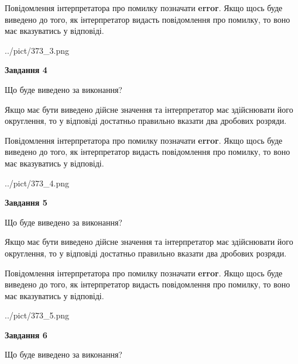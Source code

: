 \documentclass[12pt, ukrainian]{article}
\begin{document}
{\begin {Large}
Повідомлення інтерпретатора про помилку позначати \textbf{error}.
Якщо щось буде виведено до того, як інтерпретатор видасть повідомлення про помилку, 
то воно має вказуватись у відповіді. \par

\begin{center}
	{../pict/373_3.png}
\end{center}
\newpage

{\begin {center}\textbf{Завдання 4}\end {center}}\par
Що буде виведено за виконання? \par

Якщо має бути виведено дійсне значення та інтерпретатор має здійснювати його округлення, 
то у відповіді достатньо правильно вказати два дробових розряди.

Повідомлення інтерпретатора про помилку позначати \textbf{error}.
Якщо щось буде виведено до того, як інтерпретатор видасть повідомлення про помилку, 
то воно має вказуватись у відповіді. \par

\begin{center}
	{../pict/373_4.png}
\end{center}
\newpage

{\begin {center}\textbf{Завдання 5}\end {center}}\par
Що буде виведено за виконання? \par

Якщо має бути виведено дійсне значення та інтерпретатор має здійснювати його округлення, 
то у відповіді достатньо правильно вказати два дробових розряди.

Повідомлення інтерпретатора про помилку позначати \textbf{error}.
Якщо щось буде виведено до того, як інтерпретатор видасть повідомлення про помилку, 
то воно має вказуватись у відповіді. \par

\begin{center}
	{../pict/373_5.png}
\end{center}
\newpage

{\begin {center}\textbf{Завдання 6}\end {center}}\par
Що буде виведено за виконання? \par


\end{Large}}
\end{document}
